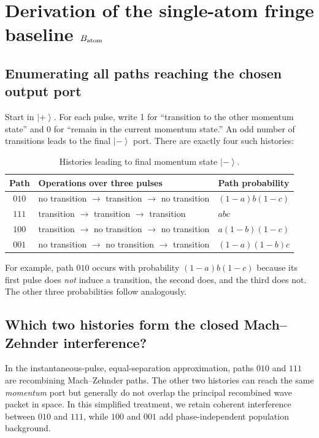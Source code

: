 \documentclass[11pt,a4paper]{article}
\numberwithin{equation}{section}
\newcommand{\ket}[1]{\left|#1\right\rangle}
\begin{document}
\section{Derivation of the single-atom fringe baseline $B_{\rm atom}$}

\subsection{Enumerating all paths reaching the chosen output port}

Start in $\ket{+}$. For each pulse, write 1 for ``transition to the other
momentum state'' and 0 for ``remain in the current momentum state.'' An odd
number of transitions leads to the final $\ket{-}$ port. There are exactly
four such histories:
\begin{table}[ht]
\centering
\caption{Histories leading to final momentum state $\ket{-}$.}
\begin{tabular}{cll}\toprule
Path & Operations over three pulses & Path probability\\\midrule
$010$ & no transition $\to$ transition $\to$ no transition
      & $(1-a)b(1-c)$\\
$111$ & transition $\to$ transition $\to$ transition & $abc$\\
$100$ & transition $\to$ no transition $\to$ no transition
      & $a(1-b)(1-c)$\\
$001$ & no transition $\to$ no transition $\to$ transition
      & $(1-a)(1-b)c$\\\bottomrule
\end{tabular}
\end{table}
For example, path $010$ occurs with probability $(1-a)b(1-c)$ because
its first pulse does \emph{not} induce a transition, the second does, and the
third does not. The other three probabilities follow analogously.

\subsection{Which two histories form the closed Mach--Zehnder interference?}

In the instantaneous-pulse, equal-separation approximation, paths $010$ and
$111$ are recombining Mach--Zehnder paths. The other two histories can reach
the same \emph{momentum} port but generally do not overlap the principal
recombined wave packet in space. In this simplified treatment, we retain
coherent interference between $010$ and $111$, while $100$ and $001$ add
phase-independent population background.
\end{document}
